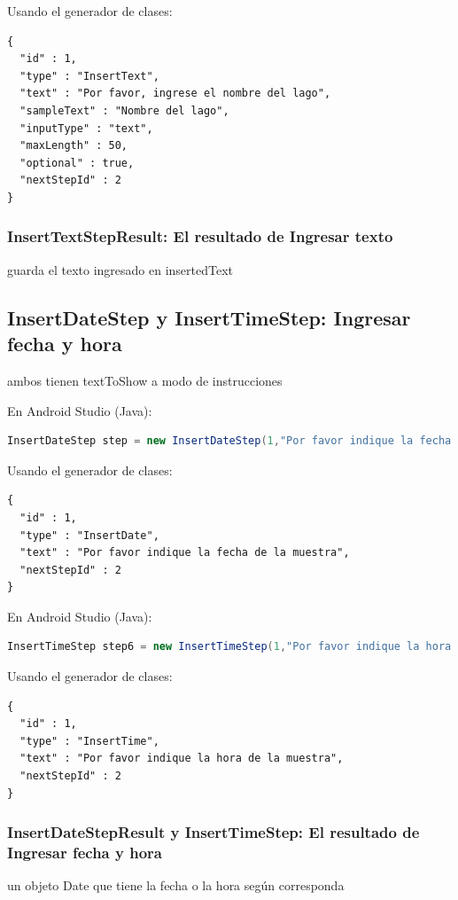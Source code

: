 Usando el generador de clases:
\begin{lstlisting}[language=XML, frame=tlb]	
{
  "id" : 1,
  "type" : "InsertText",
  "text" : "Por favor, ingrese el nombre del lago",
  "sampleText" : "Nombre del lago",
  "inputType" : "text",
  "maxLength" : 50,
  "optional" : true,
  "nextStepId" : 2
}
\end{lstlisting}

\subsubsection{InsertTextStepResult: El resultado de Ingresar texto}
guarda el texto ingresado en insertedText

\subsection{InsertDateStep y InsertTimeStep: Ingresar fecha y hora}
ambos tienen textToShow a modo de instrucciones

En Android Studio (Java):
\begin{lstlisting}[language=Java, frame=tlb]	
InsertDateStep step = new InsertDateStep(1,"Por favor indique la fecha de la muestra",2); 
\end{lstlisting}

Usando el generador de clases:
\begin{lstlisting}[language=XML, frame=tlb]	
{
  "id" : 1,
  "type" : "InsertDate",
  "text" : "Por favor indique la fecha de la muestra",
  "nextStepId" : 2
}
\end{lstlisting}

En Android Studio (Java):
\begin{lstlisting}[language=Java, frame=tlb]	
InsertTimeStep step6 = new InsertTimeStep(1,"Por favor indique la hora de la muestra",2); 
\end{lstlisting}

Usando el generador de clases:
\begin{lstlisting}[language=XML, frame=tlb]	
{
  "id" : 1,
  "type" : "InsertTime",
  "text" : "Por favor indique la hora de la muestra",
  "nextStepId" : 2
}
\end{lstlisting}

\subsubsection{InsertDateStepResult y InsertTimeStep: El resultado de Ingresar fecha y hora}
un objeto Date que tiene la fecha o la hora según corresponda

